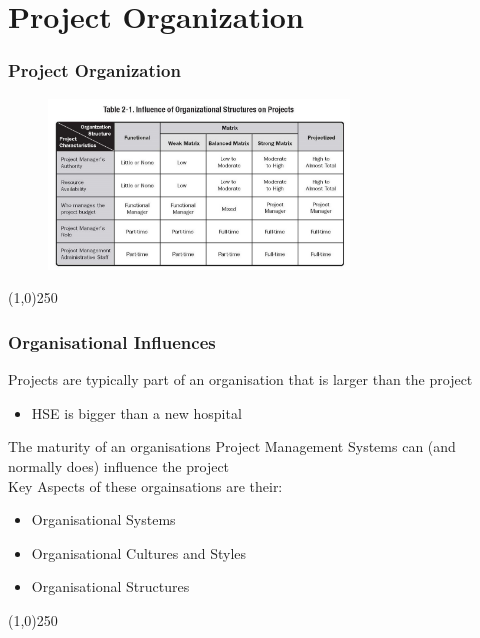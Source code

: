 \section{Project Organization}


\begin{frame}
\frametitle{Project Organization}
 \begin{figure}
 	\centering
 		\includegraphics[width = 8cm]{images/tbl2-1.jpg}
 	\label{tbl:2-1}
 \end{figure}
\end{frame}
\begin{center}\line(1,0){250}\end{center}



\begin{frame}
\frametitle{Organisational Influences}
Projects are typically part of an organisation that is larger than the project\\
\begin{itemize}
	\item HSE is bigger than a new hospital
\end{itemize}
The maturity of an organisations Project Management Systems can (and normally does) influence the project\\
Key Aspects of these orgainsations are their:\\
	\begin{itemize}
		\item Organisational Systems
		\item Organisational Cultures and Styles
		\item Organisational Structures
	\end{itemize}
\end{frame}
\begin{center}\line(1,0){250}\end{center}



